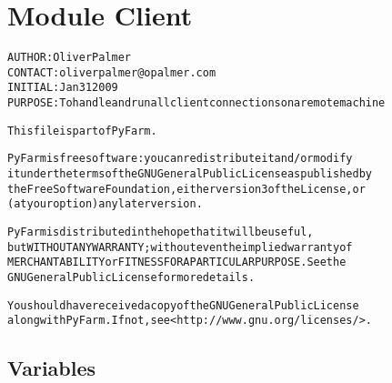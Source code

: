 %
%
%


\section{Module Client}

    \label{Client}
\begin{alltt}

AUTHOR: Oliver Palmer
CONTACT: oliverpalmer@opalmer.com
INITIAL: Jan 31 2009
PURPOSE: To handle and run all client connections on a remote machine

    This file is part of PyFarm.

    PyFarm is free software: you can redistribute it and/or modify
    it under the terms of the GNU General Public License as published by
    the Free Software Foundation, either version 3 of the License, or
    (at your option) any later version.

    PyFarm is distributed in the hope that it will be useful,
    but WITHOUT ANY WARRANTY; without even the implied warranty of
    MERCHANTABILITY or FITNESS FOR A PARTICULAR PURPOSE.  See the
    GNU General Public License for more details.

    You should have received a copy of the GNU General Public License
    along with PyFarm.  If not, see {\textless}http://www.gnu.org/licenses/{\textgreater}.
\end{alltt}



  \subsection{Variables}

